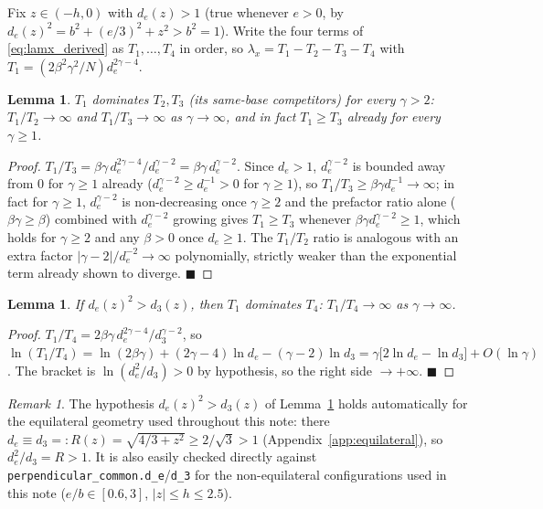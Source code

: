 \documentclass[11pt,a4paper]{article}
\theoremstyle{plain}
\newtheorem{lemma}[theorem]{Lemma}
\theoremstyle{definition}
\theoremstyle{remark}
\newtheorem{remark}[theorem]{Remark}
\newcommand{\lam}{\lambda}
\newcommand{\bw}{\beta}
\newcommand{\de}{d_e}
\newcommand{\dth}{d_3}
\begin{document}
Fix $z\in(-h,0)$ with $\de(z)>1$ (true whenever $e>0$, by
$\de(z)^2=b^2+(e/3)^2+z^2>b^2=1$). Write the four terms of
\eqref{eq:lamx_derived} as $T_1,\dots,T_4$ in order, so
$\lam_x=T_1-T_2-T_3-T_4$ with $T_1=(2\bw^2\gamma^2/N)\de^{2\gamma-4}$.

\begin{lemma}
\label{lem:samebase}
$T_1$ dominates $T_2,T_3$ (its same-base competitors) for every $\gamma>2$:
$T_1/T_2\to\infty$ and $T_1/T_3\to\infty$ as $\gamma\to\infty$, and in fact
$T_1\ge T_3$ already for every $\gamma\ge 1$.
\end{lemma}
\begin{proof}
$T_1/T_3=\bw\gamma\,\de^{2\gamma-4}/\de^{\gamma-2}=\bw\gamma\,\de^{\gamma-2}$.
Since $\de>1$, $\de^{\gamma-2}$ is bounded away from $0$ for $\gamma\ge1$
already ($\de^{\gamma-2}\ge \de^{-1}>0$ for $\gamma\ge1$), so $T_1/T_3\ge
\bw\gamma\de^{-1}\to\infty$; in fact for $\gamma\ge1$, $\de^{\gamma-2}$ is
non-decreasing once $\gamma\ge2$ and the prefactor ratio alone
($\bw\gamma\ge\bw$) combined with $\de^{\gamma-2}$ growing gives $T_1\ge T_3$
whenever $\bw\gamma\de^{\gamma-2}\ge1$, which holds for $\gamma\ge2$ and any
$\bw>0$ once $\de\ge1$. The $T_1/T_2$ ratio is analogous with an extra
factor $|\gamma-2|/\de^{-2}\to\infty$ polynomially, strictly weaker than the
exponential term already shown to diverge. $\blacksquare$
\end{proof}

\begin{lemma}
\label{lem:crossbase}
If $\de(z)^2>\dth(z)$, then $T_1$ dominates $T_4$: $T_1/T_4\to\infty$ as
$\gamma\to\infty$.
\end{lemma}
\begin{proof}
$T_1/T_4=2\bw\gamma\,\de^{2\gamma-4}/\dth^{\gamma-2}$, so
$\ln(T_1/T_4)=\ln(2\bw\gamma)+(2\gamma-4)\ln\de-(\gamma-2)\ln\dth
=\gamma\big[2\ln\de-\ln\dth\big]+O(\ln\gamma)$. The bracket is
$\ln(\de^2/\dth)>0$ by hypothesis, so the right side $\to+\infty$.
$\blacksquare$
\end{proof}

\begin{remark}
The hypothesis $\de(z)^2>\dth(z)$ of Lemma~\ref{lem:crossbase} holds
automatically for the equilateral geometry used throughout this note: there
$\de\equiv\dth=:R(z)=\sqrt{4/3+z^2}\ge2/\sqrt3>1$ (Appendix~\ref{app:equilateral}),
so $\de^2/\dth=R>1$. It is also easily checked directly against
\texttt{perpendicular\_common.d\_e}/\texttt{d\_3} for the non-equilateral
configurations used in this note ($e/b\in[0.6,3]$, $|z|\le h\le2.5$).
\end{remark}
\end{document}
